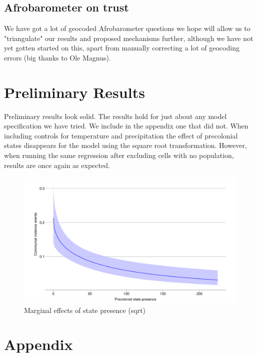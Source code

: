 \documentclass[12pt]{article}
\begin{document}
\subsection{Afrobarometer on trust}

We have got a lot of geocoded Afrobarometer questions we hope will allow us to
"triangulate" our results and proposed mechanisms further, although we have not
yet gotten started on this, apart from manually correcting a lot of geocoding
errors (big thanks to Ole Magnus).

\section{Preliminary Results}


Preliminary results look solid. The results hold for just about any model
specification we have tried. We include in the appendix one that did not. When
including controls for temperature and precipitation the effect of precolonial
states disappears for the model using the square root transformation. However,
when running the same regression after excluding cells with no population,
results are once again as expected.

\begin{figure}[htpb]
	\centering
	\includegraphics[width=1\linewidth]{../R/Output/CommunalViolenceMargins.pdf}
	\caption{Marginal effects of state presence (sqrt)}
	\label{margins}
\end{figure}






\pagebreak




\pagebreak

\section{Appendix}




\end{document}
